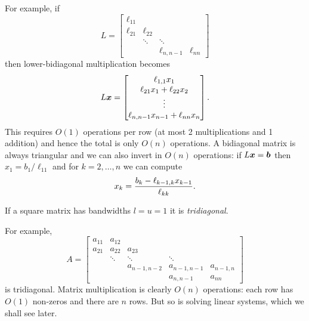 For example, if
\[
L = \begin{bmatrix}\ensuremath{\ell}_{11} \\
\ensuremath{\ell}_{21}& \ensuremath{\ell}_{22} \\ 
& \ensuremath{\ddots} & \ensuremath{\ddots} \\
 &&\ensuremath{\ell}_{n,n-1} &\ensuremath{\ell}_{nn}
\end{bmatrix}
\]
then lower-bidiagonal multiplication becomes
\[
L\bm{{\mbox{\boldmath$x$\unboldmath}}} = \begin{bmatrix} \ell_{1,1} x_1 \\ \ell_{21} x_1 + \ell_{22} x_2    \\ \vdots \\ 
\ell_{n,n-1} x_{n-1} + \ell_{nn} x_n \end{bmatrix}.
\]
This requires $O(1)$ operations per row (at most 2 multiplications and 1 addition) and hence the total is only $O(n)$ operations. A bidiagonal matrix is always triangular and we can also invert in $O(n)$ operations: if $L \bm{{\mbox{\boldmath$x$\unboldmath}}} = \bm{{\mbox{\boldmath$b$\unboldmath}}}$ then $x_1 = b_1/\ensuremath{\ell}_{11}$  and for $k = 2,\ensuremath{\ldots},n$ we can compute
\[
x_k = {b_k - \ensuremath{\ell}_{k-1,k} x_{k-1} \over \ensuremath{\ell}_{kk}}.
\]
\begin{definition}[Tridiagonal] If a square matrix has bandwidths $l = u = 1$ it is \emph{tridiagonal}. \end{definition}

For example,
\[
A = \begin{bmatrix} a_{11} & a_{12} \\
a_{21} & a_{22} & a_{23} \\
 & \ensuremath{\ddots} & \ensuremath{\ddots} & \ensuremath{\ddots} \\
&& a_{n-1,n-2} &                                 a_{n-1,n-1} & a_{n-1,n} \\
&&&a_{n,n-1} & a_{nn}
\end{bmatrix}
\]
is tridiagonal. Matrix multiplication is clearly $O(n)$ operations: each row has $O(1)$ non-zeros and there are $n$ rows. But so is solving linear systems, which we shall see later.



